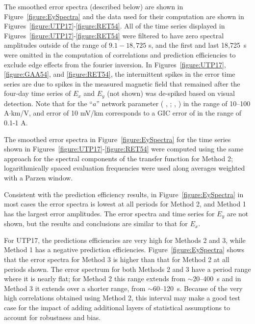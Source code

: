 \documentclass[linenumbers,draft]{agujournal}
\newcommand{\citeay}[1]{%
\citeauthor{#1}, \citeyear{#1}%
}
\begin{document}
The smoothed error spectra (described below) are shown in Figure~\ref{figure:EySpectra} and the data used for their computation are shown in Figures~\ref{figure:UTP17}-\ref{figure:RET54}.  All of the time series displayed in Figures~\ref{figure:UTP17}-\ref{figure:RET54} were filtered to have zero spectral amplitudes outside of the range of $9.1-18,725$ s, and the first and last 18,725~s were omitted in the computation of correlations and prediction efficiencies to exclude edge effects from the fourier inversion.  In Figures~\ref{figure:UTP17}, \ref{figure:GAA54}, and \ref{figure:RET54}, the intermittent spikes in the error time series are due to spikes in the measured magnetic field that remained after the four-day time series of $E_x$ and $E_y$ (not shown) was de-spiked based on visual detection.  Note that for the ``$a$'' network parameter (\citeay{Lehtinen1985}; \citeay{Pulkkinen2010}) in the range of 10--100 A$\cdot$km/V, and error of 10 mV/km corresponds to a GIC error of in the range of 0.1-1 A.

The smoothed error spectra in Figure~\ref{figure:EySpectra} for the time series shown in Figures~\ref{figure:UTP17}-\ref{figure:RET54} were computed using the same approach for the spectral components of the transfer function for Method 2; logarithmically spaced evaluation frequencies were used along averages weighted with a Parzen window.


Consistent with the prediction efficiency results, in Figure~\ref{figure:EySpectra} in most cases the error spectra is lowest at all periods for Method 2, and Method 1 has the largest error amplitudes. The error spectra and time series for $E_y$ are not shown, but the results and conclusions are similar to that for $E_x$. 

For UTP17, the predictions efficiencies are very high for Methods 2 and 3, while Method 1 has a negative prediction efficiencies.  Figure~\ref{figure:EySpectra} shows that the error spectra for Method 3 is higher than that for Method 2 at all periods shown.  The error spectrum for both Methods 2 and 3 have a period range where it is nearly flat; for Method 2 this range extends from $\sim$20--400~s and in Method 3 it extends over a shorter range, from $\sim$60--120~s.  Because of the very high correlations obtained using Method 2, this interval may make a good test case for the impact of adding additional layers of statistical assumptions to account for robustness and bias.
\end{document}
